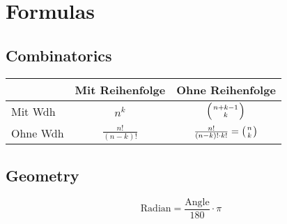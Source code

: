 \documentclass[11pt]{article}
\begin{document}
\section{Formulas}

\subsection{Combinatorics}
\begin{tabular}{ | l | c | c |}
  \hline
   & Mit Reihenfolge & Ohne Reihenfolge \\ \hline
   Mit Wdh & $n^k$ & $\left( {n+k-1} \atop k \right)$  \\ \hline
   Ohne Wdh & $\frac{n!}{\left( n-k \right) !}$ & $\frac{n!}{\left( n-k \right) !\cdot k!} = \left( n \atop k \right)$  \\ \hline
\end{tabular}


\subsection{Geometry}
$$\text{Radian} = \frac{\text{Angle}}{180}\cdot \pi$$
\end{document}
